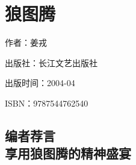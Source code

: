 


\section{狼图腾}



\par 作者：姜戎
\par 出版社：长江文艺出版社
\par 出版时间：2004-04
\par ISBN：9787544762540




\subsection{编者荐言\\享用狼图腾的精神盛宴}

